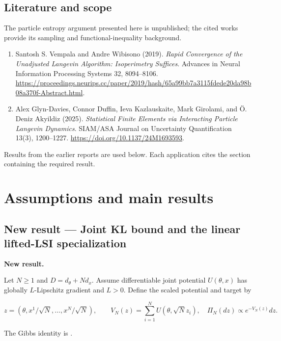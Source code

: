 \documentclass[11pt,a4paper]{report}
\begin{document}
\section*{Literature and scope}
The particle entropy argument presented here is unpublished; the cited works provide its sampling and functional-inequality background.

\begin{enumerate}
\item Santosh S. Vempala and Andre Wibisono (2019). \emph{Rapid Convergence of the Unadjusted Langevin Algorithm: Isoperimetry Suffices}. Advances in Neural Information Processing Systems 32, 8094–8106. \url{https://proceedings.neurips.cc/paper/2019/hash/65a99bb7a3115fdede20da98b08a370f-Abstract.html}.
\item Alex Glyn-Davies, Connor Duffin, Ieva Kazlauskaite, Mark Girolami, and Ö. Deniz Akyildiz (2025). \emph{Statistical Finite Elements via Interacting Particle Langevin Dynamics}. SIAM/\allowbreak{}ASA Journal on Uncertainty Quantification 13(3), 1200–1227. \url{https://doi.org/10.1137/24M1693593}.
\end{enumerate}
Results from the earlier reports \cite{LangevinLean2026ULASC,LangevinLean2026ULALSI,LangevinLean2026IPLA} are used below. Each application cites the section containing the required result.

\tableofcontents
\clearpage
{}
\chapter{Assumptions and main results}
\section{\texorpdfstring{New result — Joint KL bound and the linear lifted-LSI specialization}{New result — Joint KL bound and the linear lifted-LSI specialization}}


\textbf{New result.}



Let \(N\ge1\) and \(D=d_\theta+Nd_x\). Assume differentiable joint potential \(U(\theta,x)\) has globally \(L\)-Lipschitz gradient and \(L>0\). Define the scaled potential and target by

\[z=(\theta,x^1/\sqrt N,\ldots,x^N/\sqrt N),\qquad
V_N(z)=\sum_{i=1}^NU(\theta,\sqrt N z_i),\quad
\Pi_N(dz)\propto e^{-V_N(z)}dz.\]

The Gibbs identity is \cite[Section~3.5.1]{LangevinLean2026IPLA}.
\end{document}
